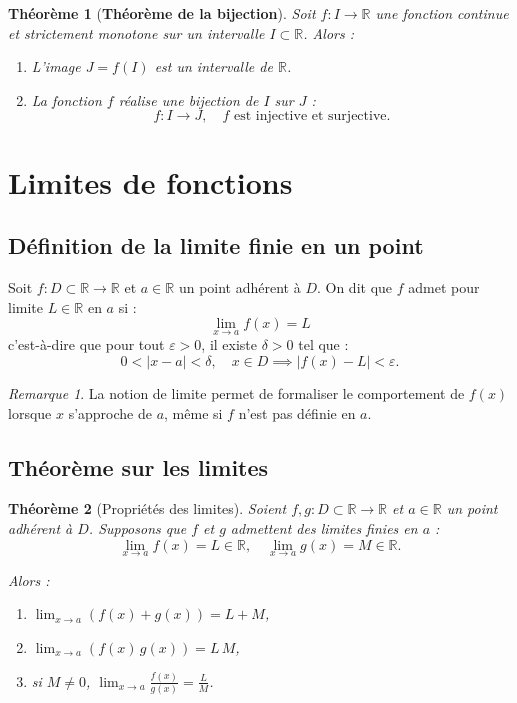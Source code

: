 \documentclass{report} %
\theoremstyle{definition}  %
\theoremstyle{plain} %
\newtheorem{theorem}{Théorème}[chapter]
\theoremstyle{remark} %
\newtheorem*{remark}{Remarque} %
\begin{document}
\begin{theorem}[\textbf{Théorème de la bijection}]
Soit \(f : I \to \mathbb{R}\) une fonction continue et strictement monotone sur un intervalle \(I \subset \mathbb{R}\).  
Alors :
\begin{enumerate}
    \item L'image \(J = f(I)\) est un intervalle de \(\mathbb{R}\).
    \item La fonction \(f\) réalise une bijection de \(I\) sur \(J\) :
    \[
    f : I \longrightarrow J, \quad f \text{ est injective et surjective.}
    \]
\end{enumerate}
\end{theorem}


\section{\textbf{Limites de fonctions}}

\subsection{Définition de la limite finie en un point}

Soit \(f : D \subset \mathbb{R} \to \mathbb{R}\) et \(a \in \mathbb{R}\) un point adhérent à \(D\).  
On dit que \(f\) admet pour limite \(L \in \mathbb{R}\) en \(a\) si :
\[
\lim_{x \to a} f(x) = L
\]
c'est-à-dire que pour tout \(\varepsilon > 0\), il existe \(\delta > 0\) tel que :
\[
0 < |x-a| < \delta, \quad x \in D \implies |f(x)-L| < \varepsilon.
\]

\begin{remark}
La notion de limite permet de formaliser le comportement de \(f(x)\) lorsque \(x\) s'approche de \(a\), même si \(f\) n'est pas définie en \(a\).
\end{remark}

\medskip

\subsection{Théorème sur les limites}

\begin{theorem}[Propriétés des limites]
Soient \(f, g : D \subset \mathbb{R} \to \mathbb{R}\) et \(a \in \mathbb{R}\) un point adhérent à \(D\).  
Supposons que \(f\) et \(g\) admettent des limites finies en \(a\) :
\[
\lim_{x \to a} f(x) = L \in \mathbb{R}, \quad \lim_{x \to a} g(x) = M \in \mathbb{R}.
\]

Alors :
\begin{enumerate}
    \item \(\displaystyle \lim_{x \to a} (f(x) + g(x)) = L + M\),
    \item \(\displaystyle \lim_{x \to a} (f(x)\, g(x)) = L\, M\),
    \item si \(M \neq 0\), \(\displaystyle \lim_{x \to a} \frac{f(x)}{g(x)} = \frac{L}{M}\).
\end{enumerate}
\end{theorem}
\end{document}
